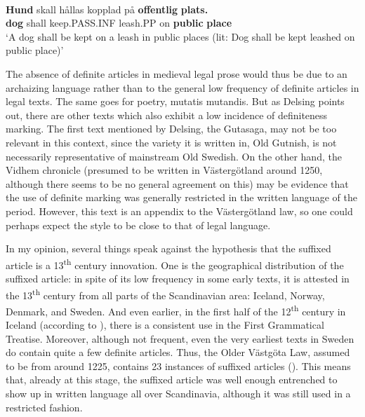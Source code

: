 \ea\label{}
\\
\gll	\textbf{Hund} skall  hållas  kopplad  på  \textbf{offentlig} \textbf{  plats.}\\
		\textbf{dog} shall  keep.PASS.INF  leash.PP  on  \textbf{public} \textbf{place}\\
\glt ‘A dog shall be kept on a leash in public places (lit: Dog shall be kept leashed on public place)’

\z

The absence of definite articles in medieval legal prose would thus be due to an archaizing language rather than to the general low frequency of definite articles in legal texts. The same goes for poetry, mutatis mutandis. But as Delsing points out, there are other texts which also exhibit a low incidence of definiteness marking. The first text mentioned by Delsing, the Gutasaga, may not be too relevant in this context, since the variety it is written in, Old Gutnish, is not necessarily representative of mainstream Old Swedish.  On the other hand, the Vidhem chronicle (presumed to be written in Västergötland around 1250, although there seems to be no general agreement on this) may be evidence that the use of definite marking was generally restricted in the written language of the period. However, this text is an appendix to the Västergötland law, so one could perhaps expect the style to be close to that of legal language. 

In my opinion, several things speak against the hypothesis that the suffixed article is a 13\textsuperscript{th} century innovation. One is the geographical distribution of the suffixed article: in spite of its low frequency in some early texts, it is attested in the 13\textsuperscript{th} century from all parts of the Scandinavian area: Iceland, Norway, Denmark, and Sweden.  And even earlier, in the first half of the 12\textsuperscript{th} century in Iceland (according to \citet[§1019]{Perridon2002}), there is a consistent use in the First Grammatical Treatise. Moreover, although not frequent, even the very earliest texts in Sweden do contain quite a few definite articles. Thus, the Older Västgöta Law, assumed to be from around 1225, contains 23 instances of suffixed articles (\citet[24]{Larm1936}). This means that, already at this stage, the suffixed article was well enough entrenched to show up in written language all over Scandinavia, although it was still used in a restricted fashion. 

